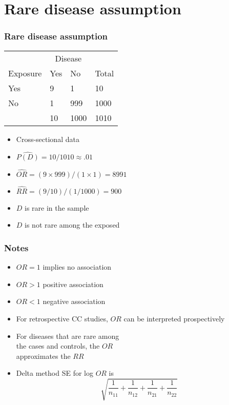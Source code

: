 \documentclass[aspectratio=169]{beamer}
\begin{document}
\section{Rare disease assumption}
\begin{frame}\frametitle{Rare disease assumption}
\begin{center}
\ttfamily
  \begin{tabular}{llll}
&\multicolumn{2}{c}{Disease} & \\ \cline{2-3}
Exposure & Yes  & No & Total \\ \hline
Yes      &   9  &    1 & 10   \\
No       &   1  &  999 & 1000 \\ \hline
         &  10  & 1000 & 1010 
  \end{tabular}
\normalfont
\end{center}
\begin{itemize}
\item Cross-sectional data 
\item $\hat{P(D)} = 10 / 1010 \approx .01$
\item $\hat{OR} = (9 \times 999) / (1 \times 1) = 8991$
\item $\hat{RR} = (9 / 10) / (1 / 1000) = 900$
\item $D$ is rare in the sample
\item $D$ is not rare among the exposed
\end{itemize}
\end{frame}


\begin{frame}\frametitle{Notes}
\begin{itemize}
\item $OR = 1$ implies no association
\item $OR > 1$ positive association
\item $OR < 1$ negative association
\item For retrospective CC studies, $OR$ 
  can be interpreted prospectively
\item For diseases that are rare among \\
  the cases and controls, the $OR$ \\ approximates
  the $RR$
\item Delta method SE for log $OR$ is
$$
\sqrt{\frac{1}{n_{11}} + \frac{1}{n_{12}} + \frac{1}{n_{21}} + \frac{1}{n_{22}}}
$$
\end{itemize}
\end{frame}
\end{document}

